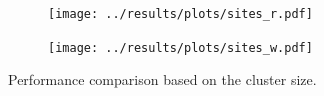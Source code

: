 \documentclass[border=2cm]{standalone}
\begin{document}
\begin{minipage}{17cm}
\begin{figure}[t]
    \begin{subfigure}{.26\linewidth}
      \centering
      \texttt{[image: ../results/plots/sites\_r.pdf]}
      \label{fig:sites_read}
    \end{subfigure}
    \hspace*{0.5cm}
    \begin{subfigure}{.26\linewidth}
      \centering
      \texttt{[image: ../results/plots/sites\_w.pdf]}
      \label{fig:sites_write}
    \end{subfigure}
    \nextfloat
    \caption{Performance comparison based on the cluster size.}
    \label{fig:scale}
  \end{figure}


\end{minipage}
\end{document}
